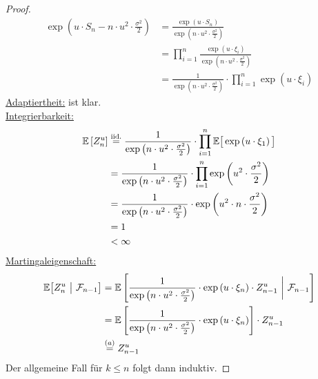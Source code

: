 \documentclass[12pt,a4paper]{article}
\begin{document}
\begin{proof}
\begin{align*}
	\exp\left(u\cdot S_n-n\cdot u^2\cdot\frac{\sigma^2}{2}\right)
	&= \frac{\exp(u\cdot S_n)}{\exp\left(n\cdot u^2\cdot\frac{\sigma^2}{2}\right)} \\
	&=\prod_{i=1}^n \frac{\exp\left(u\cdot \xi_i\right)}{\exp\left(n\cdot u^2\cdot \frac{\sigma^2}{2}\right)} \\
	&=\frac{1}{\exp\left(n\cdot u^2\cdot \frac{\sigma^2}{2}\right)}\cdot\prod_{i=1}^n \exp\left(u\cdot\xi_i\right)
\end{align*}
\underline{Adaptiertheit:} ist klar.\\

\underline{Integrierbarkeit:}
\begin{align*}
	\mathbb{E}\left[Z^u_n\right] 
	&\stackrel{\text{iid.}}{=}\frac{1}{\exp\left(n\cdot u^2\cdot\frac{\sigma^2}{2}\right)}\cdot\prod_{i=1}^n \mathbb{E}\big[\exp\left(u\cdot\xi_1\right)\big] \\
	&=\frac{1}{\exp\left(n\cdot u^2\cdot\frac{\sigma^2}{2}\right)}\cdot\prod_{i=1}^n \exp\left(u^2\cdot\frac{\sigma^2}{2}\right) \\
	&=\frac{1}{\exp\left(n\cdot u^2\cdot\frac{\sigma^2}{2}\right)}\cdot \exp\left(u^2\cdot n\cdot\frac{\sigma^2}{2}\right) \\
	&=1 \\
	&<\infty
\end{align*}
\underline{Martingaleigenschaft:}
\begin{align*}
	\mathbb{E}\big[Z_n^u ~\big|~\mathcal{F}_{n-1}\big]
	&=\mathbb{E}\left[\frac{1}{\exp\left(n\cdot u^2\cdot\frac{\sigma^2}{2}\right)}\cdot\exp\left(u\cdot\xi_n\right)\cdot Z^u_{n-1}~\bigg|~\mathcal{F}_{n-1}\right]\\
	&=\mathbb{E}\left[\frac{1}{\exp\left(n\cdot u^2\cdot\frac{\sigma^2}{2}\right)}\cdot\exp\left(u\cdot\xi_n\right)\right]\cdot Z^u_{n-1}\\
	&\stackrel{(a)}{=} Z^u_{n-1}
\end{align*}
Der allgemeine Fall für $k\leq n$ folgt dann induktiv.
\end{proof}
\end{document}
